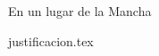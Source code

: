 \documentclass[a4paper,openany,oneside,12pt]{report}
\begin{document}

En un lugar de la Mancha 

{justificacion.tex}

% 
% 
\end{document}
